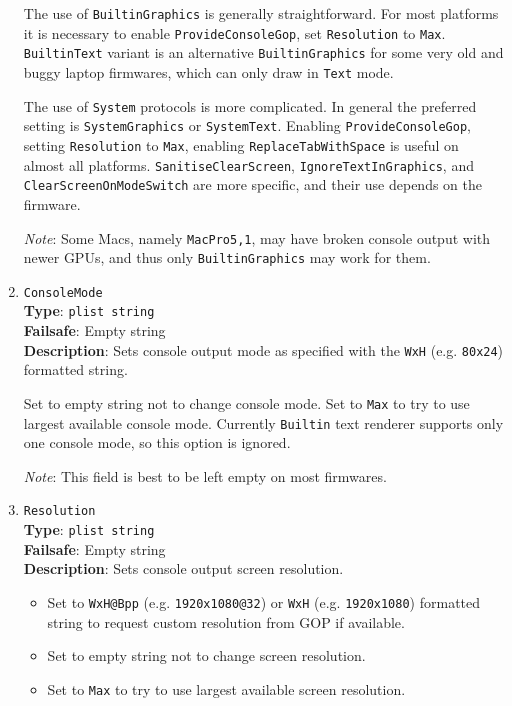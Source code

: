 \documentclass[]{article}
\providecommand{\tightlist}{%
  \setlength{\itemsep}{0pt}\setlength{\parskip}{0pt}}
\begin{document}
\begin{enumerate}
  The use of \texttt{BuiltinGraphics} is generally straightforward.
  For most platforms it is necessary to enable \texttt{ProvideConsoleGop},
  set \texttt{Resolution} to \texttt{Max}. \texttt{BuiltinText} variant is
  an alternative \texttt{BuiltinGraphics} for some very old and buggy laptop
  firmwares, which can only draw in \texttt{Text} mode.

  The use of \texttt{System} protocols is more complicated. In general
  the preferred setting is \texttt{SystemGraphics} or \texttt{SystemText}.
  Enabling \texttt{ProvideConsoleGop}, setting \texttt{Resolution} to
  \texttt{Max}, enabling \texttt{ReplaceTabWithSpace} is useful on almost
  all platforms. \texttt{SanitiseClearScreen}, \texttt{IgnoreTextInGraphics},
  and \texttt{ClearScreenOnModeSwitch} are more specific, and their use
  depends on the firmware.

  \emph{Note}: Some Macs, namely \texttt{MacPro5,1}, may have broken
  console output with newer GPUs, and thus only \texttt{BuiltinGraphics}
  may work for them.

\item
  \texttt{ConsoleMode}\\
  \textbf{Type}: \texttt{plist\ string}\\
  \textbf{Failsafe}: Empty string\\
  \textbf{Description}: Sets console output mode as specified
  with the \texttt{WxH} (e.g. \texttt{80x24}) formatted string.

  Set to empty string not to change console mode. Set to \texttt{Max}
  to try to use largest available console mode. Currently
  \texttt{Builtin} text renderer supports only one console mode, so
  this option is ignored.

  \emph{Note}: This field is best to be left empty on most firmwares.

\item
  \texttt{Resolution}\\
  \textbf{Type}: \texttt{plist\ string}\\
  \textbf{Failsafe}: Empty string\\
  \textbf{Description}: Sets console output screen resolution.

  \begin{itemize}
  \tightlist
  \item Set to \texttt{WxH@Bpp} (e.g. \texttt{1920x1080@32}) or \texttt{WxH}
  (e.g. \texttt{1920x1080}) formatted string to request custom resolution
  from GOP if available.
  \item Set to empty string not to change screen resolution.
  \item Set to \texttt{Max} to try to use largest available screen resolution.
  \end{itemize}


\end{enumerate}
\end{document}
